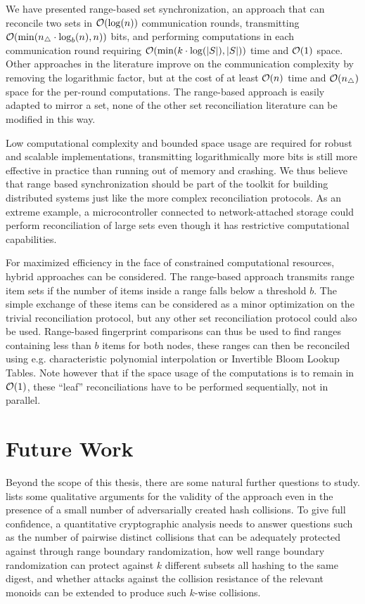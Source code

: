 
We have presented range-based set synchronization, an approach that can reconcile two sets in $\mathcal{O}(\log(n))$ communication rounds, transmitting $\mathcal{O}(\min(n_{\triangle} \cdot \log_b(n), n))$ bits, and performing computations in each communication round requiring $\mathcal{O}(\min(k \cdot \log(|{S}|), |{S}|))$ time and $\mathcal{O}(1)$ space. Other approaches in the literature improve on the communication complexity by removing the logarithmic factor, but at the cost of at least $\mathcal{O}(n)$ time and $\mathcal{O}(n_{\triangle})$ space for the per-round computations. The range-based approach is easily adapted to mirror a set, none of the other set reconciliation literature can be modified in this way.

Low computational complexity and bounded space usage are required for robust and scalable implementations, transmitting logarithmically more bits is still more effective in practice than running out of memory and crashing. We thus believe that range based synchronization should be part of the toolkit for building distributed systems just like the more complex reconciliation protocols. As an extreme example, a microcontroller connected to network-attached storage could perform reconciliation of large sets even though it has restrictive computational capabilities.

For maximized efficiency in the face of constrained computational resources, hybrid approaches can be considered. The range-based approach transmits range item sets if the number of items inside a range falls below a threshold $b$. The simple exchange of these items can be considered as a minor optimization on the trivial reconciliation protocol, but any other set reconciliation protocol could also be used. Range-based fingerprint comparisons can thus be used to find ranges containing less than $b$ items for both nodes, these ranges can then be reconciled using e.g. characteristic polynomial interpolation or Invertible Bloom Lookup Tables. Note however that if the space usage of the computations is to remain in $\mathcal{O}(1)$, these ``leaf'' reconciliations have to be performed sequentially, not in parallel.

\section{Future Work}

Beyond the scope of this thesis, there are some natural further questions to study.  lists some qualitative arguments for the validity of the approach even in the presence of a small number of adversarially created hash collisions. To give full confidence, a quantitative cryptographic analysis needs to answer questions such as the number of pairwise distinct collisions that can be adequately protected against through range boundary randomization, how well range boundary randomization can protect against $k$ different subsets all hashing to the same digest, and whether attacks against the collision resistance of the relevant monoids can be extended to produce such $k$-wise collisions.

